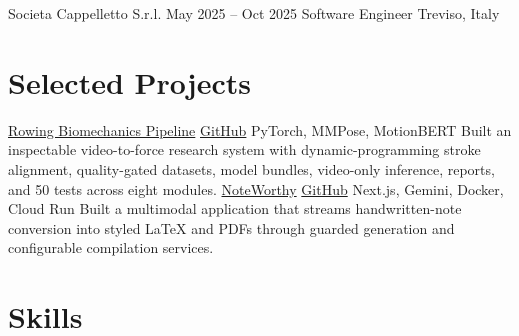 \ResumeEntry
  {Societa Cappelletto S.r.l.}
  {May 2025 -- Oct 2025}
  {Software Engineer}
  {Treviso, Italy}
\begin{ResumeItems}
\end{ResumeItems}

\section{Selected Projects}
\ProjectEntry
  {\href{https://www.giacomocappelletto.com/research/rowing-biomechanics}{Rowing Biomechanics Pipeline} \enspace\textbar\enspace \href{https://github.com/JJCAPPE/rowing-dynamics-analysis}{GitHub}}
  {PyTorch, MMPose, MotionBERT}
  {Built an inspectable video-to-force research system with dynamic-programming stroke alignment, quality-gated datasets, model bundles, video-only inference, reports, and 50 tests across eight modules.}
\ProjectEntry
  {\href{https://noteworthy-giacomo-cappellettos-projects.vercel.app/}{NoteWorthy} \enspace\textbar\enspace \href{https://github.com/JJCAPPE/NoteWorthy}{GitHub}}
  {Next.js, Gemini, Docker, Cloud Run}
  {Built a multimodal application that streams handwritten-note conversion into styled LaTeX and PDFs through guarded generation and configurable compilation services.}

\AthleticsAwards

\section{Skills}
